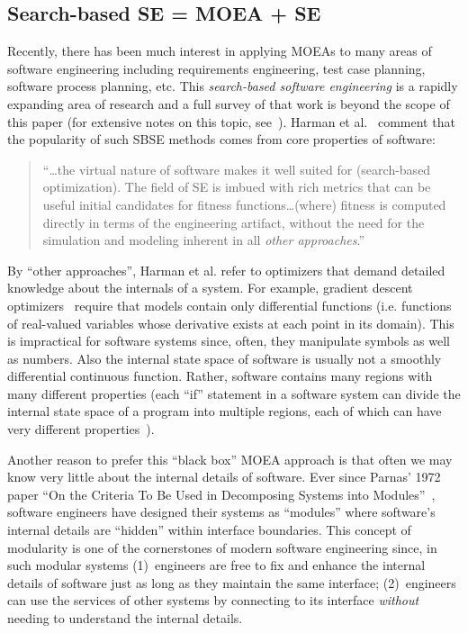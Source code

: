 \documentclass[10pt,journal,compsoc]{IEEEtran}
\newenvironment{changed}{\par\color{MyDarkBlue}}{\par}
\begin{document}
\begin{changed}
\subsection{Search-based SE = MOEA + SE}\label{sec:abutsbse}
Recently, there has been much interest in applying
MOEAs to many areas of software engineering
including requirements engineering, test case
planning, software process planning, etc. 
This {\em search-based software engineering} is a  rapidly expanding area of research and a full survey of that work is beyond
the scope of this paper (for extensive notes on this topic, see~\cite{harman12abc,harman14}). 
Harman et
al.~\cite{harman12abc} comment  that the popularity of
such SBSE methods comes from core
properties of software:
\begin{quote}
``{\ldots}the virtual nature of
software makes it well suited for (search-based
optimization). The field of SE is imbued with rich
metrics that can be useful initial candidates for
fitness functions{\ldots}(where) fitness is computed
directly in terms of the engineering artifact,
without the need for the simulation and modeling
inherent in all {\em other approaches}.''
\end{quote}
By  ``other approaches'',
Harman et al. refer to optimizers
that demand detailed knowledge  about  the internals
 of a system. For example,
gradient descent optimizers~\cite{saltelli00} require that
models contain only differential functions
(i.e. functions of real-valued variables whose
derivative exists at each point in its
domain).
This is impractical  for  software systems since, often,
they manipulate symbols as well as numbers.
Also the  internal state space of software is
usually not a smoothly differential continuous function.
Rather, software contains many regions
with many different properties (each ``if''
statement in a software system can divide the
internal state space of a program into multiple
regions, each of which can have very different
properties~\cite{lowrey98}).

Another reason to prefer this ``black box'' MOEA approach is that
often we may know  very little about the internal details of software.
Ever since Parnas' 1972 paper ``On the Criteria To
Be Used in Decomposing Systems into
Modules''~\cite{parnas72}, software engineers have
designed their systems as ``modules'' where software's
internal details are ``hidden'' within interface
boundaries.  
This concept of modularity is one of the cornerstones of modern
software engineering since, in such modular systems
(1)~engineers are free
to fix and enhance the internal details of software just as long as they
maintain the same interface;
(2)~engineers can use the services of other systems by connecting to its interface {\em without}
needing to understand the internal details.


\end{changed}
\end{document}
